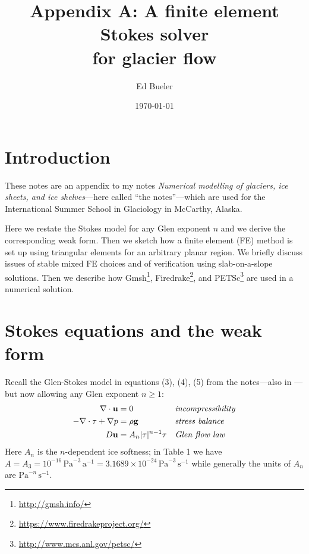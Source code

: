 \documentclass[letterpaper,final,12pt,reqno]{amsart}
\newcommand{\bu}{\mathbf{u}}
\begin{document}
\graphicspath{{../figures/}}

\title{Appendix A: A finite element Stokes solver \\ for glacier flow}

\author{Ed Bueler}

\date{\today}

\maketitle

\renewcommand{\theequation}{A\arabic{equation}}


\section{Introduction}

These notes are an appendix to my notes \emph{Numerical modelling of glaciers, ice sheets, and ice shelves}---here called ``the notes''---which are used for the International Summer School in Glaciology in McCarthy, Alaska.

Here we restate the Stokes model for any Glen exponent $n$ and we derive the corresponding weak form.  Then we sketch how a finite element (FE) method \cite{Elmanetal2014} is set up using triangular elements for an arbitrary planar region.  We briefly discuss issues of stable mixed FE choices and of verification using slab-on-a-slope solutions.  Then we describe how Gmsh\footnote{\url{http://gmsh.info/}}, Firedrake\footnote{\url{https://www.firedrakeproject.org/}}, and PETSc\footnote{\url{http://www.mcs.anl.gov/petsc/}} are used in a numerical solution.


\section{Stokes equations and the weak form}

Recall the Glen-Stokes model in equations (3), (4), (5) from the notes---also in \cite{GreveBlatter2009,JouvetRappaz2011}---but now allowing any Glen exponent $n\ge 1$:
\begin{align}
\nabla \cdot \mathbf{u} &= 0 &&\text{\emph{incompressibility}} \label{incompressible} \\
- \nabla \cdot \tau + \nabla p &= \rho \mathbf{g} &&\text{\emph{stress balance}} \label{forcebalance} \\
D\bu &= A_n |\tau|^{n-1} \tau &&\text{\emph{Glen flow law}} \label{flowlaw}
\end{align}
Here $A_n$ is the $n$-dependent ice softness; in Table 1 we have $A = A_3 = 10^{-16} \,\text{Pa}^{-3}\,\text{a}^{-1} = 3.1689 \times 10^{-24} \,\text{Pa}^{-3}\,\text{s}^{-1}$ while generally the units of $A_n$ are $\text{Pa}^{-n}\,\text{s}^{-1}$.
\end{document}
